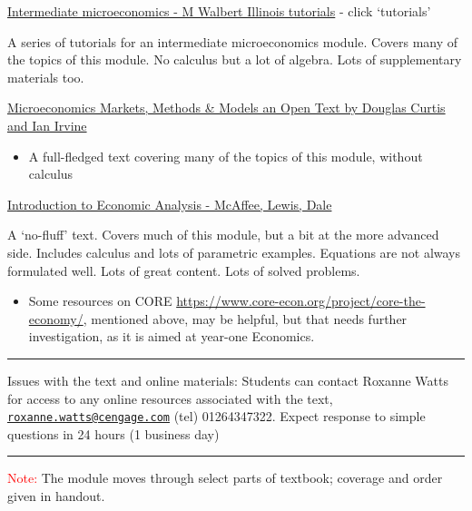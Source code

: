 \documentclass[]{article}
\providecommand{\tightlist}{%
  \setlength{\itemsep}{0pt}\setlength{\parskip}{0pt}}
\begin{document}
\href{http://my.ilstu.edu/~mswalber/ECO240/index.html}{Intermediate microeconomics - M Walbert Illinois tutorials} - click `tutorials'

A series of tutorials for an intermediate microeconomics module. Covers many of the topics of this module. No calculus but a lot of algebra. Lots of supplementary materials too.

\href{https://laecon1.lyryx.com/textbooks/OPEN_CURTIS_MIC_1/marketing/CurtisIrvine-Microeconomics-2017A.pdf}{Microeconomics
Markets, Methods \& Models
an Open Text
by Douglas Curtis and Ian Irvine}

\begin{itemize}
\tightlist
\item
  A full-fledged text covering many of the topics of this module, without calculus
\end{itemize}

\href{https://www.kellogg.northwestern.edu/faculty/dale/ieav21.pdf}{Introduction to
Economic Analysis - McAffee, Lewis, Dale}

A `no-fluff' text. Covers much of this module, but a bit at the more advanced side. Includes calculus and lots of parametric examples. Equations are not always formulated well. Lots of great content. Lots of solved problems.

\bigskip

\begin{itemize}
\tightlist
\item
  Some resources on CORE \url{https://www.core-econ.org/project/core-the-economy/}, mentioned above, may be helpful, but that needs further investigation, as it is aimed at year-one Economics.
\end{itemize}

\begin{center}\rule{0.5\linewidth}{\linethickness}\end{center}

Issues with the text and online materials: Students can contact Roxanne Watts for access to any online resources associated with the text, \href{mailto:roxanne.watts@cengage.com}{\nolinkurl{roxanne.watts@cengage.com}} (tel) 01264347322. Expect response to simple questions in 24 hours (1 business day)

\begin{center}\rule{0.5\linewidth}{\linethickness}\end{center}

\textcolor{red}{Note:} The module moves through select parts of textbook; coverage and order given in handout.
\end{document}
